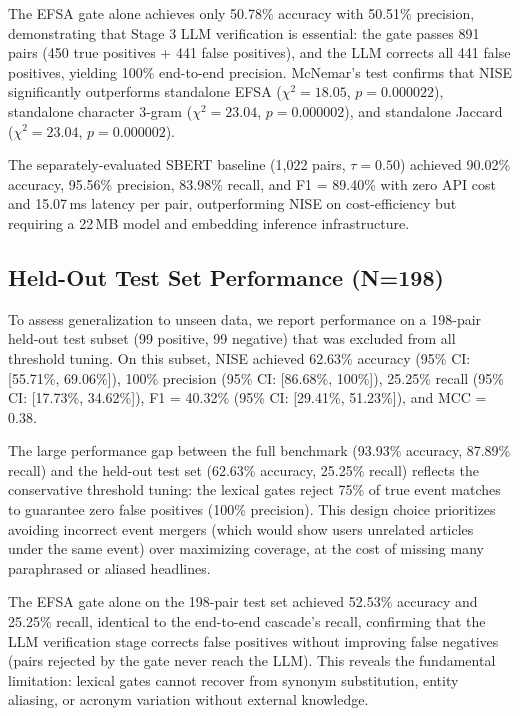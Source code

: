 \documentclass[conference]{IEEEtran}
\begin{document}
The EFSA gate alone achieves only 50.78\% accuracy with 50.51\% precision, demonstrating that Stage 3 LLM verification is essential: the gate passes 891 pairs (450 true positives + 441 false positives), and the LLM corrects all 441 false positives, yielding 100\% end-to-end precision.
McNemar's test confirms that NISE significantly outperforms standalone EFSA ($\chi^2 = 18.05$, $p = 0.000022$), standalone character 3-gram ($\chi^2 = 23.04$, $p = 0.000002$), and standalone Jaccard ($\chi^2 = 23.04$, $p = 0.000002$).

The separately-evaluated SBERT baseline (1,022 pairs, $\tau = 0.50$) achieved 90.02\% accuracy, 95.56\% precision, 83.98\% recall, and F1 = 89.40\% with zero API cost and 15.07\,ms latency per pair, outperforming NISE on cost-efficiency but requiring a 22\,MB model and embedding inference infrastructure.

\subsection{Held-Out Test Set Performance (N=198)}
To assess generalization to unseen data, we report performance on a 198-pair held-out test subset (99 positive, 99 negative) that was excluded from all threshold tuning.
On this subset, NISE achieved 62.63\% accuracy (95\% CI: [55.71\%, 69.06\%]), 100\% precision (95\% CI: [86.68\%, 100\%]), 25.25\% recall (95\% CI: [17.73\%, 34.62\%]), F1 = 40.32\% (95\% CI: [29.41\%, 51.23\%]), and MCC = 0.38.

The large performance gap between the full benchmark (93.93\% accuracy, 87.89\% recall) and the held-out test set (62.63\% accuracy, 25.25\% recall) reflects the conservative threshold tuning: the lexical gates reject 75\% of true event matches to guarantee zero false positives (100\% precision).
This design choice prioritizes avoiding incorrect event mergers (which would show users unrelated articles under the same event) over maximizing coverage, at the cost of missing many paraphrased or aliased headlines.

The EFSA gate alone on the 198-pair test set achieved 52.53\% accuracy and 25.25\% recall, identical to the end-to-end cascade's recall, confirming that the LLM verification stage corrects false positives without improving false negatives (pairs rejected by the gate never reach the LLM).
This reveals the fundamental limitation: lexical gates cannot recover from synonym substitution, entity aliasing, or acronym variation without external knowledge.
\end{document}
